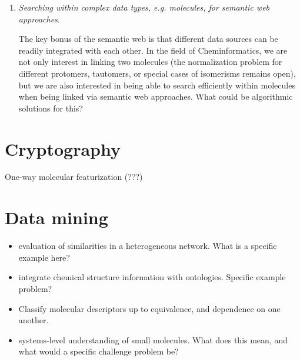 \documentclass{sig-alternate}
\begin{document}
\begin{enumerate}
\item \emph{Searching within complex data types, e.g. molecules, for semantic web approaches}.

The key bonus of the semantic web is that different data sources can be readily integrated with each other. In the field
of Cheminformatics, we are not only interest in linking two molecules 
(the normalization problem for different protomers, tautomers, or special cases of isomerisms remains open), but we
are also interested in being able to search efficiently within molecules when being linked via semantic web approaches.
What could be algorithmic solutions for this?
\end{enumerate}

\section*{Cryptography}
One-way molecular featurization (???)

\section*{Data mining}
\begin{itemize}
\item evaluation of similarities in a heterogeneous network.  What is a specific example here?
\item integrate chemical structure information with ontologies.  Specific example problem?
\item Classify molecular descriptors up to equivalence, and dependence on one another.
\item systems-level understanding of small molecules.  What does this mean, and what would a specific challenge problem be?
\end{itemize}
\end{document}
